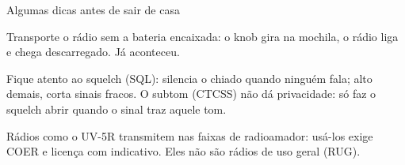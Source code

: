 \begin{frame}{Algumas dicas antes de sair de casa}
  \small
  \begin{dica}
    Transporte o rádio \alert{sem a bateria encaixada}: o knob gira na mochila, o rádio liga e
    chega descarregado. Já aconteceu.
  \end{dica}

  \pause
  \begin{dica}
    Fique atento ao \alert{squelch} (SQL): silencia o chiado quando ninguém fala; alto demais, corta sinais fracos. O subtom (CTCSS) \alert{não dá privacidade}: só faz o squelch abrir quando o sinal traz aquele tom.
  \end{dica}

  \pause
  \begin{regulamento}
    Rádios como o UV-5R transmitem nas faixas de radioamador: usá-los exige \alert{COER e licença} com indicativo. Eles não são rádios de uso geral (RUG).
  \end{regulamento}
\end{frame}

